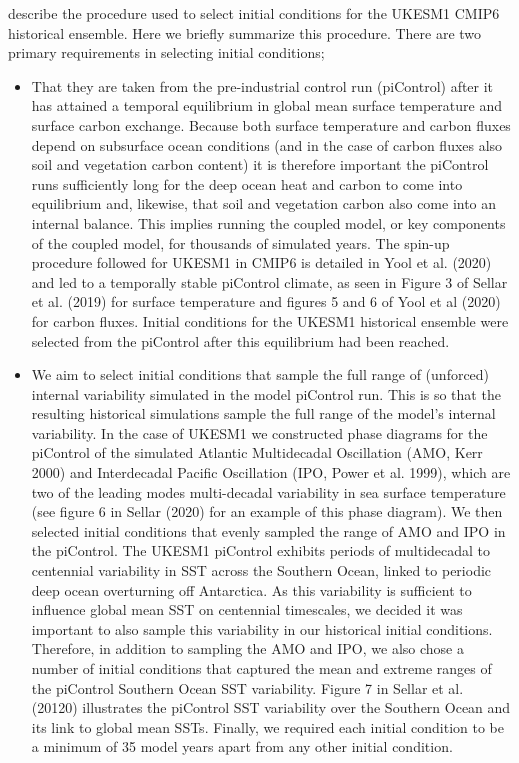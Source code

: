 \citet{sellar2020implementation} describe the procedure used to select initial conditions for the UKESM1 CMIP6 historical ensemble. Here we briefly summarize this procedure. There are two primary requirements in selecting initial conditions;
\begin{itemize}
    \item That they are taken from the pre-industrial control run (piControl) after it has attained a temporal equilibrium in global mean surface temperature and surface carbon exchange. Because both surface temperature and carbon fluxes depend on subsurface ocean conditions (and in the case of carbon fluxes also soil and vegetation carbon content) it is therefore important the piControl runs sufficiently long for the deep ocean heat and carbon to come into equilibrium and, likewise, that soil and vegetation carbon also come into an internal balance. This implies running the coupled model, or key components of the coupled model, for thousands of simulated years. The spin-up procedure followed for UKESM1 in CMIP6 is detailed in Yool et al. (2020) and led to a temporally stable piControl climate, as seen in Figure 3 of Sellar et al. (2019) for surface temperature and figures 5 and 6 of Yool et al (2020) for carbon fluxes. Initial conditions for the UKESM1 historical ensemble were selected from the piControl after this equilibrium had been reached.
    \item We aim to select initial conditions that sample the full range of (unforced) internal variability simulated in the model piControl run. This is so that the resulting historical simulations sample the full range of the model’s internal variability. In the case of UKESM1 we constructed phase diagrams for the piControl of the simulated Atlantic Multidecadal Oscillation (AMO, Kerr 2000) and Interdecadal Pacific Oscillation (IPO, Power et al. 1999), which are two of the leading modes multi-decadal variability in sea surface temperature (see figure 6 in Sellar (2020) for an example of this phase diagram). We then selected initial conditions that evenly sampled the range of AMO and IPO in the piControl. The UKESM1 piControl exhibits periods of multidecadal to centennial variability in SST across the Southern Ocean, linked to periodic deep ocean overturning off Antarctica. As this variability is sufficient to influence global mean SST on centennial timescales, we decided it was important to also sample this variability in our historical initial conditions. Therefore, in addition to sampling the AMO and IPO, we also chose a number of initial conditions that captured the mean and extreme ranges of the piControl Southern Ocean SST variability. Figure 7 in Sellar et al. (20120) illustrates the piControl SST variability over the Southern Ocean and its link to global mean SSTs. Finally, we required each initial condition to be a minimum of 35 model years apart from any other initial condition.
\end{itemize}
 

